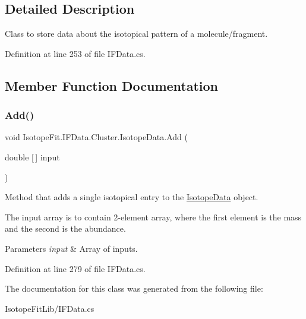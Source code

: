 \subsection{Detailed Description}
Class to store data about the isotopical pattern of a molecule/fragment. 



Definition at line 253 of file I\+F\+Data.\+cs.



\subsection{Member Function Documentation}
\mbox{\label{class_isotope_fit_1_1_i_f_data_1_1_cluster_1_1_isotope_data_a6f2c01094e5e4d0f68166664adeedd99}} 
\subsubsection{\texorpdfstring{Add()}{Add()}}
{\footnotesize\ttfamily void Isotope\+Fit.\+I\+F\+Data.\+Cluster.\+Isotope\+Data.\+Add (\begin{DoxyParamCaption}\item[{double \mbox{[}$\,$\mbox{]}}]{input }\end{DoxyParamCaption})}



Method that adds a single isotopical entry to the \mbox{\hyperlink{class_isotope_fit_1_1_i_f_data_1_1_cluster_1_1_isotope_data}{Isotope\+Data}} object. 

The input array is to contain 2-\/element array, where the first element is the mass and the second is the abundance. 


\begin{DoxyParams}{Parameters}
{\em input} & Array of inputs.\\
\hline
\end{DoxyParams}


Definition at line 279 of file I\+F\+Data.\+cs.



The documentation for this class was generated from the following file\+:\begin{DoxyCompactItemize}
\item 
Isotope\+Fit\+Lib/I\+F\+Data.\+cs\end{DoxyCompactItemize}

